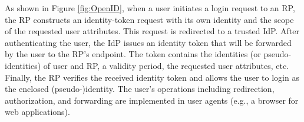 As shown in Figure \ref{fig:OpenID}, when a user initiates a login request to an RP, the RP constructs an identity-token request with its own identity and the scope of the requested user attributes.
This request is redirected to a trusted IdP.
After authenticating the user, the IdP issues an identity token that will be forwarded by the user to the RP's endpoint.
The token contains the identities (or pseudo-identities) of user and RP,
        a validity period, the requested user attributes, etc.
Finally, the RP verifies the received identity token and allows the user to login as the  enclosed (pseudo-)identity.
The user's operations including redirection, authorization, and forwarding are implemented in user agents (e.g., a browser for web applications).




